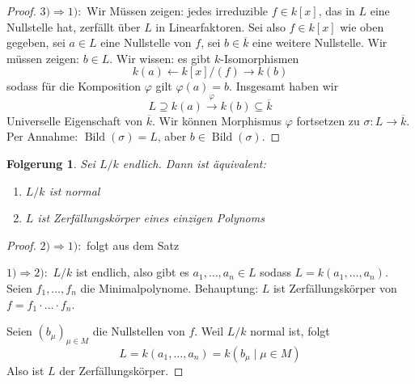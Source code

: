 \documentclass[a4paper,12pt,numbers=noenddot,parskip=full]{scrartcl}
\newcommand{\heading}{\underline}
\theoremstyle{dotless}
\newtheorem{corollary}[theorem]{Folgerung}
\theoremstyle{remark}
\begin{document}
\begin{proof}
		\heading{$3) \Rightarrow 1):$} Wir Müssen zeigen: jedes irreduzible $f \in k[x]$, das in $L$ eine Nullstelle hat, zerfällt über $L$ in Linearfaktoren. Sei also $f \in k[x]$ wie oben gegeben, sei $a \in L$ eine Nullstelle von $f$, sei $b \in \overline{k}$ eine weitere Nullstelle. Wir müssen zeigen: $b \in L$. Wir wissen: es gibt $k$-Isomorphismen
		\begin{equation*}
			k(a) \longleftarrow k[x]/(f) \longrightarrow k(b)
		\end{equation*}
		sodass für die Komposition $\varphi$ gilt $\varphi(a) = b$. Insgesamt haben wir
		\begin{equation*}
			L \supseteq k(a) \overset{\varphi}{\longrightarrow} k(b) \subseteq \overline{k}
		\end{equation*}
		Universelle Eigenschaft von $\overline{k}$. Wir können Morphismus $\varphi$ fortsetzen zu $\sigma: L \to \overline{k}$. Per Annahme: $\operatorname{Bild}(\sigma) = L$, aber $b \in \operatorname{Bild}(\sigma)$.
	\end{proof}

	\begin{corollary}
		Sei $L/k$ endlich. Dann ist äquivalent:
		\begin{enumerate}
			\item $L/k$ ist normal
			\item $L$ ist Zerfällungskörper eines einzigen Polynoms
		\end{enumerate}
	\end{corollary}

	\begin{proof}
		\heading{$2) \Rightarrow 1):$} folgt aus dem Satz
		
		\heading{$1) \Rightarrow 2):$} $L/k$ ist endlich, also gibt es $a_1, \dots, a_n \in L$ sodass $L = k(a_1, \dots, a_n)$. Seien $f_1, \dots, f_n$ die Minimalpolynome. Behauptung: $L$ ist Zerfällungskörper von $f = f_1 \cdot \ldots \cdot f_n$.
		
		Seien $(b_\mu)_{\mu \in M}$ die Nullstellen von $f$. Weil $L/k$ normal ist, folgt
		\begin{equation*}
			L = k(a_1, \dots, a_n) = k(b_\mu \mid \mu \in M)
		\end{equation*}
		Also ist $L$ der Zerfällungskörper.
	\end{proof}
\end{document}
